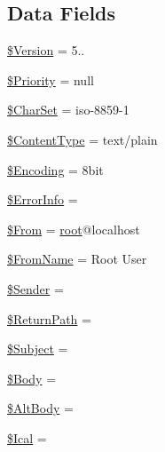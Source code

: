 \subsection*{Data Fields}
\begin{DoxyCompactItemize}
\item 
\hyperlink{class_p_h_p_mailer_a8a43e1c8b245951155d04b279276af95}{\$\+Version} = \textquotesingle{}5..\textquotesingle{}
\item 
\hyperlink{class_p_h_p_mailer_a7c6546640ba3eafd143d8f0e6805de27}{\$\+Priority} = null
\item 
\hyperlink{class_p_h_p_mailer_aafc11e59da1a3f7e242b6987f1cb514a}{\$\+Char\+Set} = \textquotesingle{}iso-\/8859-\/1\textquotesingle{}
\item 
\hyperlink{class_p_h_p_mailer_a35c42684e94e56e60bfc1a8ec2cbcd08}{\$\+Content\+Type} = \textquotesingle{}text/plain\textquotesingle{}
\item 
\hyperlink{class_p_h_p_mailer_a7c44f20127f1436e9315b5fcfee472f3}{\$\+Encoding} = \textquotesingle{}8bit\textquotesingle{}
\item 
\hyperlink{class_p_h_p_mailer_a4aa7f2e8bf834210cc4522666115e03e}{\$\+Error\+Info} = \textquotesingle{}\textquotesingle{}
\item 
\hyperlink{class_p_h_p_mailer_a9f9e5bc6226feedebe3135b210eb5ef8}{\$\+From} = \textquotesingle{}\hyperlink{_chart_8_radar_8js_a33796d6d1aed1fe6b4c866bfd3867459}{root}@localhost\textquotesingle{}
\item 
\hyperlink{class_p_h_p_mailer_a0338c56bfb2ac4229c555a97222f47c2}{\$\+From\+Name} = \textquotesingle{}Root User\textquotesingle{}
\item 
\hyperlink{class_p_h_p_mailer_a0fd52b1481fe1434c5810ca3cb098985}{\$\+Sender} = \textquotesingle{}\textquotesingle{}
\item 
\hyperlink{class_p_h_p_mailer_a51413bc6dfa3e9122897131c4b369a19}{\$\+Return\+Path} = \textquotesingle{}\textquotesingle{}
\item 
\hyperlink{class_p_h_p_mailer_a2b58ba25576b17f0a874336a68a44a62}{\$\+Subject} = \textquotesingle{}\textquotesingle{}
\item 
\hyperlink{class_p_h_p_mailer_afcecd01958faa0a6eec878226ffe09f1}{\$\+Body} = \textquotesingle{}\textquotesingle{}
\item 
\hyperlink{class_p_h_p_mailer_a5a3adc4eeed7620a1290e2364cee9084}{\$\+Alt\+Body} = \textquotesingle{}\textquotesingle{}
\item 
\hyperlink{class_p_h_p_mailer_ace4b3f5855e39dec9993867ed920e30b}{\$\+Ical} = \textquotesingle{}\textquotesingle{}

\end{DoxyCompactItemize}
